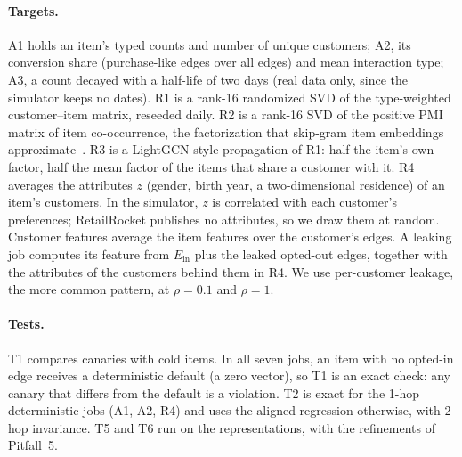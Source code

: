 \documentclass[10pt,twocolumn,letterpaper]{article}
\theoremstyle{definition}
\newcommand{\Ein}{E_{\mathrm{in}}}
\begin{document}
\paragraph{Targets.}
A1 holds an item's typed counts and number of unique customers; A2, its
conversion share (purchase-like edges over all edges) and mean interaction
type; A3, a count decayed with a half-life of two days (real data only, since
the simulator keeps no dates). R1 is a rank-16 randomized SVD of the
type-weighted customer--item matrix, reseeded daily. R2 is a rank-16 SVD of the
positive PMI matrix of item co-occurrence, the factorization that skip-gram
item embeddings approximate~\citep{levy2014neural}. R3 is a LightGCN-style
propagation of R1: half the item's own factor, half the mean factor of the
items that share a customer with it. R4 averages the attributes $z$ (gender,
birth year, a two-dimensional residence) of an item's customers. In the
simulator, $z$ is correlated with each customer's preferences; RetailRocket
publishes no attributes, so we draw them at random. Customer features average
the item features over the customer's edges. A leaking job computes its
feature from $\Ein$ plus the leaked opted-out edges, together with the
attributes of the customers behind them in R4. We use per-customer leakage,
the more common pattern, at $\rho=0.1$ and $\rho=1$.

\paragraph{Tests.}
T1 compares canaries with cold items. In all seven jobs, an item with no
opted-in edge receives a deterministic default (a zero vector), so T1 is an
exact check: any canary that differs from the default is a violation. T2 is
exact for the 1-hop deterministic jobs (A1, A2, R4) and uses the aligned
regression otherwise, with 2-hop invariance. T5 and T6 run on the
representations, with the refinements of Pitfall~5.
\end{document}
